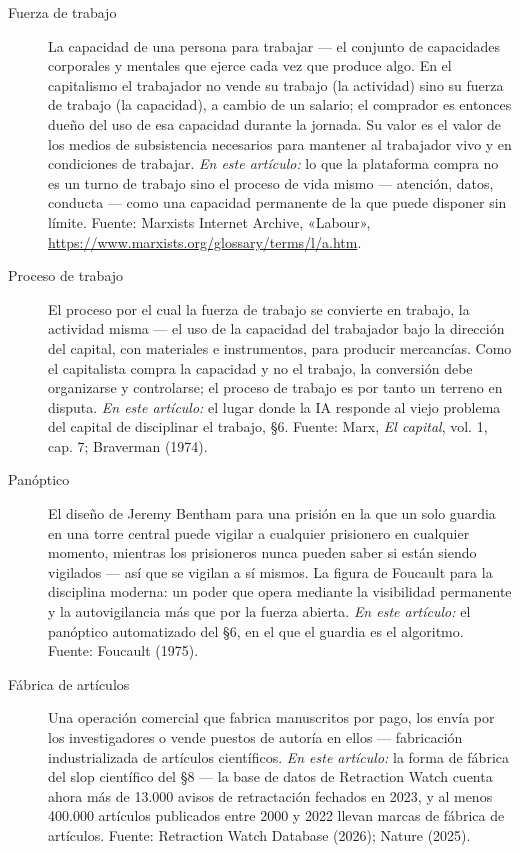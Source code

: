 \documentclass[11pt]{article}
\begin{document}
\begin{description}
\item[Fuerza de trabajo] La capacidad de una persona para trabajar ---
el conjunto de capacidades corporales y mentales que ejerce cada vez
que produce algo. En el capitalismo el trabajador no vende su trabajo
(la actividad) sino su fuerza de trabajo (la capacidad), a cambio de un
salario; el comprador es entonces dueño del uso de esa capacidad
durante la jornada. Su valor es el valor de los medios de subsistencia
necesarios para mantener al trabajador vivo y en condiciones de
trabajar. \emph{En este artículo:} lo que la plataforma compra no es
un turno de trabajo sino el proceso de vida mismo --- atención, datos,
conducta --- como una capacidad permanente de la que puede disponer sin
límite. Fuente: Marxists Internet Archive, «Labour»,
\url{https://www.marxists.org/glossary/terms/l/a.htm}.

\item[Proceso de trabajo] El proceso por el cual la fuerza de trabajo se
convierte en trabajo, la actividad misma --- el uso de la capacidad del
trabajador bajo la dirección del capital, con materiales e instrumentos,
para producir mercancías. Como el capitalista compra la capacidad y no
el trabajo, la conversión debe organizarse y controlarse; el proceso de
trabajo es por tanto un terreno en disputa. \emph{En este artículo:} el
lugar donde la IA responde al viejo problema del capital de disciplinar
el trabajo, §6. Fuente: Marx, \textit{El capital}, vol. 1, cap. 7;
Braverman (1974).

\item[Panóptico] El diseño de Jeremy Bentham para una prisión en la que
un solo guardia en una torre central puede vigilar a cualquier
prisionero en cualquier momento, mientras los prisioneros nunca pueden
saber si están siendo vigilados --- así que se vigilan a sí mismos. La
figura de Foucault para la disciplina moderna: un poder que opera
mediante la visibilidad permanente y la autovigilancia más que por la
fuerza abierta. \emph{En este artículo:} el panóptico automatizado del
§6, en el que el guardia es el algoritmo. Fuente: Foucault (1975).

\item[Fábrica de artículos] Una operación comercial que fabrica
manuscritos por pago, los envía por los investigadores o vende puestos
de autoría en ellos --- fabricación industrializada de artículos
científicos. \emph{En este artículo:} la forma de fábrica del slop
científico del §8 --- la base de datos de Retraction Watch cuenta
ahora más de 13.000 avisos de retractación fechados en 2023, y al menos
400.000 artículos publicados entre 2000 y 2022 llevan marcas de fábrica
de artículos. Fuente: Retraction Watch Database (2026); Nature (2025).


\end{description}
\end{document}
